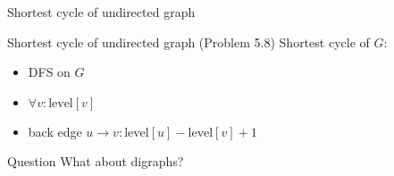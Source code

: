 \begin{frame}{Shortest cycle of undirected graph}
  \begin{exampleblock}{Shortest cycle of undirected graph (Problem 5.8)}
	Shortest cycle of $G$:
	\begin{itemize}
	  \item DFS on $G$
	  \item $\forall v: \text{level}[v]$
	  \item back edge $u \to v: \text{level}[u] - \text{level}[v] + 1$
	\end{itemize}
  \end{exampleblock}

  \pause
  \vspace{0.50cm}
  \begin{alertblock}{Question}
	What about digraphs?
  \end{alertblock}
\end{frame}
